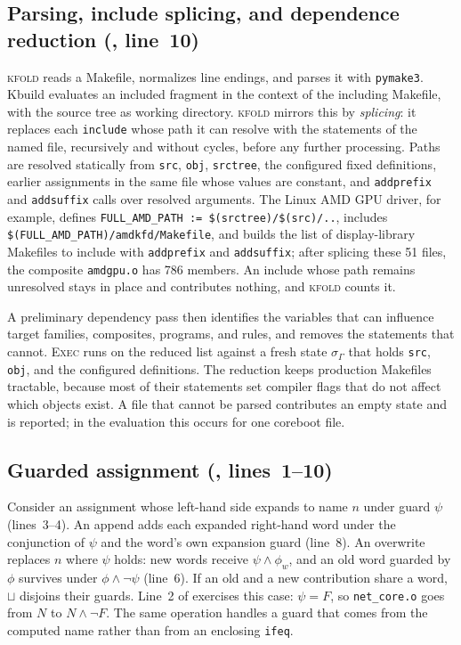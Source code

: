 \documentclass[acmsmall,screen,review]{acmart}
\newcommand{\tool}{\textsc{kfold}\xspace}
\begin{document}
\subsection{Parsing, include splicing, and dependence reduction (, line~10)}
\label{sec:design:include}
\tool reads a Makefile, normalizes line endings, and parses it with \texttt{pymake3}. Kbuild evaluates an included fragment in the context of the including Makefile, with the source tree as working directory. \tool mirrors this by \emph{splicing}: it replaces each \texttt{include} whose path it can resolve with the statements of the named file, recursively and without cycles, before any further processing. Paths are resolved statically from \texttt{src}, \texttt{obj}, \texttt{srctree}, the configured fixed definitions, earlier assignments in the same file whose values are constant, and \texttt{addprefix} and \texttt{addsuffix} calls over resolved arguments. The Linux AMD GPU driver, for example, defines \texttt{FULL\_AMD\_PATH := \$(srctree)/\$(src)/..}, includes \texttt{\$(FULL\_AMD\_PATH)/amdkfd/Makefile}, and builds the list of display-library Makefiles to include with \texttt{addprefix} and \texttt{addsuffix}; after splicing these 51 files, the composite \texttt{amdgpu.o} has 786 members. An include whose path remains unresolved stays in place and contributes nothing, and \tool counts it.

A preliminary dependency pass then identifies the variables that can influence target families, composites, programs, and rules, and removes the statements that cannot. \textsc{Exec} runs on the reduced list against a fresh state $\sigma_\Gamma$ that holds \texttt{src}, \texttt{obj}, and the configured definitions. The reduction keeps production Makefiles tractable, because most of their statements set compiler flags that do not affect which objects exist. A file that cannot be parsed contributes an empty state and is reported; in the evaluation this occurs for one coreboot file.

\subsection{Guarded assignment (, lines~1--10)}
\label{sec:design:assign}
Consider an assignment whose left-hand side expands to name $n$ under guard $\psi$ (lines~3--4). An append adds each expanded right-hand word under the conjunction of $\psi$ and the word's own expansion guard (line~8). An overwrite replaces $n$ where $\psi$ holds: new words receive $\psi\land\phi_w$, and an old word guarded by $\phi$ survives under $\phi\land\neg\psi$ (line~6). If an old and a new contribution share a word, $\sqcup$ disjoins their guards. Line~2 of  exercises this case: $\psi=F$, so \texttt{net\_core.o} goes from $N$ to $N\land\neg F$. The same operation handles a guard that comes from the computed name rather than from an enclosing \texttt{ifeq}.
\end{document}
